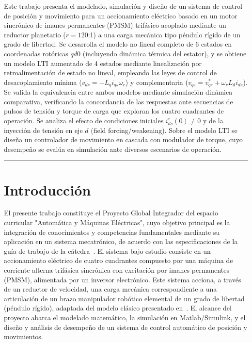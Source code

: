 \documentclass[12pt, a4paper,journal, onecolumn, compsoc]{IEEEtran}
\begin{document}
\noindent Este trabajo presenta el modelado, simulación y diseño de un sistema de control de posición y movimiento para un accionamiento eléctrico basado en un motor sincrónico de imanes permanentes (PMSM) trifásico acoplado mediante un reductor planetario ($r = 120$:1) a una carga mecánica tipo péndulo rígido de un grado de libertad. Se desarrolla el modelo no lineal completo de 6 estados en coordenadas rotóricas $qd0$ (incluyendo dinámica térmica del estator), y se obtiene un modelo LTI aumentado de 4 estados mediante linealización por retroalimentación de estado no lineal, empleando las leyes de control de desacoplamiento mínima ($v_{ds} = -L_q i_{qs} \omega_r$) y complementaria ($v_{qs} = v_{qs}^* + \omega_r L_d i_{ds}$). Se valida la equivalencia entre ambos modelos mediante simulación dinámica comparativa, verificando la concordancia de las respuestas ante secuencias de pulsos de tensión y torque de carga que exploran los cuatro cuadrantes de operación. Se analiza el efecto de condiciones iniciales $i_{ds}^r(0) \neq 0$ y de la inyección de tensión en eje $d$ (field forcing/weakening). Sobre el modelo LTI se diseña un controlador de movimiento en cascada con modulador de torque, cuyo desempeño se evalúa en simulación ante diversos escenarios de operación.

\vspace{4pt}
\noindent\rule{\textwidth}{0.4pt}

\section{Introducción}
El presente trabajo constituye el Proyecto Global Integrador del espacio curricular "Automática y Máquinas Eléctricas", cuyo objetivo principal es la integración de conocimientos y competencias fundamentales mediante su aplicación en un sistema mecatrónico, de acuerdo con las especificaciones de la guía de trabajo de la cátedra~\cite{guia_trabajo}.
El sistema bajo estudio consiste en un accionamiento eléctrico de cuatro cuadrantes compuesto por una máquina de corriente alterna trifásica sincrónica con excitación por imanes permanentes (PMSM), alimentada por un inversor electrónico. Este sistema acciona, a través de un reductor de velocidad, una carga mecánica correspondiente a una articulación de un brazo manipulador robótico elemental de un grado de libertad (péndulo rígido), adaptada del modelo clásico presentado en~\cite{kelly_robot}.
El alcance del proyecto abarca el modelado matemático, la simulación en Matlab/Simulink, y el diseño y análisis de desempeño de un sistema de control automático de posición y movimientos.
\end{document}
